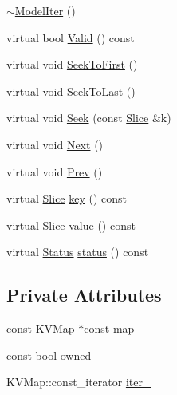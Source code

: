 \begin{DoxyCompactItemize}
\hyperlink{classleveldb_1_1_model_d_b_1_1_model_iter_a3920ed0781aebe21dfccef855ff31946}{$\sim$\+Model\+Iter} ()
\item 
virtual bool \hyperlink{classleveldb_1_1_model_d_b_1_1_model_iter_a645d712995a2926a2699a6274fdd8c96}{Valid} () const 
\item 
virtual void \hyperlink{classleveldb_1_1_model_d_b_1_1_model_iter_ac3f3118f2aa6df676e40ad848929965f}{Seek\+To\+First} ()
\item 
virtual void \hyperlink{classleveldb_1_1_model_d_b_1_1_model_iter_a73f54e91a379f3584aaa1ad99f435c5f}{Seek\+To\+Last} ()
\item 
virtual void \hyperlink{classleveldb_1_1_model_d_b_1_1_model_iter_ab581a60c36582a06a835bcaf766dc124}{Seek} (const \hyperlink{classleveldb_1_1_slice}{Slice} \&k)
\item 
virtual void \hyperlink{classleveldb_1_1_model_d_b_1_1_model_iter_ae6c95ecf39787bc465ac7482fe7cf6fa}{Next} ()
\item 
virtual void \hyperlink{classleveldb_1_1_model_d_b_1_1_model_iter_acf667aa8d5e11d6acc16134959e43c40}{Prev} ()
\item 
virtual \hyperlink{classleveldb_1_1_slice}{Slice} \hyperlink{classleveldb_1_1_model_d_b_1_1_model_iter_a53ff9e91d51bc5bcab4585758a103749}{key} () const 
\item 
virtual \hyperlink{classleveldb_1_1_slice}{Slice} \hyperlink{classleveldb_1_1_model_d_b_1_1_model_iter_ad18eafbd733612fbe9f002b56334d871}{value} () const 
\item 
virtual \hyperlink{classleveldb_1_1_status}{Status} \hyperlink{classleveldb_1_1_model_d_b_1_1_model_iter_a4798d61aefbd89c93ca7ac753b695a11}{status} () const 
\end{DoxyCompactItemize}
\subsection*{Private Attributes}
\begin{DoxyCompactItemize}
\item 
const \hyperlink{namespaceleveldb_aac1e50450147be263e08252c6700f7a7}{K\+V\+Map} $\ast$const \hyperlink{classleveldb_1_1_model_d_b_1_1_model_iter_ad74301feafbc49fb774c01848202d69f}{map\+\_\+}
\item 
const bool \hyperlink{classleveldb_1_1_model_d_b_1_1_model_iter_af5a4dd226cf3421411b622f9a9709c61}{owned\+\_\+}
\item 
K\+V\+Map\+::const\+\_\+iterator \hyperlink{classleveldb_1_1_model_d_b_1_1_model_iter_a8eef8d86a26c6b3c85a9498eb42e1075}{iter\+\_\+}
\end{DoxyCompactItemize}
